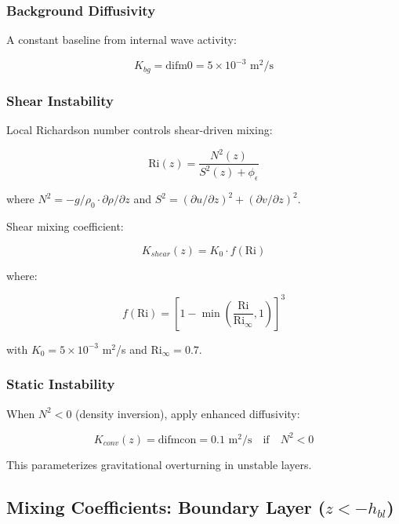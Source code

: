 \documentclass[11pt, a4paper]{article}
\begin{document}
\subsubsection{Background Diffusivity}

A constant baseline from internal wave activity:

\begin{equation}
K_{bg} = \text{difm0} = 5 \times 10^{-3} \text{ m}^2/\text{s}
\end{equation}

\subsubsection{Shear Instability}

Local Richardson number controls shear-driven mixing:

\begin{equation}
\text{Ri}(z) = \frac{N^2(z)}{S^2(z) + \phi_\epsilon}
\end{equation}

where $N^2 = -g/\rho_0 \cdot \partial\rho/\partial z$ and $S^2 = (\partial u/\partial z)^2 + (\partial v/\partial z)^2$.

Shear mixing coefficient:

\begin{equation}
K_{shear}(z) = K_0 \cdot f(\text{Ri})
\end{equation}

where:

\begin{equation}
f(\text{Ri}) = \left[1 - \min\left(\frac{\text{Ri}}{\text{Ri}_\infty}, 1\right)\right]^3
\end{equation}

with $K_0 = 5 \times 10^{-3}$ m$^2$/s and $\text{Ri}_\infty = 0.7$.

\subsubsection{Static Instability}

When $N^2 < 0$ (density inversion), apply enhanced diffusivity:

\begin{equation}
K_{conv}(z) = \text{difmcon} = 0.1 \text{ m}^2/\text{s} \quad \text{if} \quad N^2 < 0
\end{equation}

This parameterizes gravitational overturning in unstable layers.

\subsection{Mixing Coefficients: Boundary Layer ($z < -h_{bl}$)}
\end{document}

